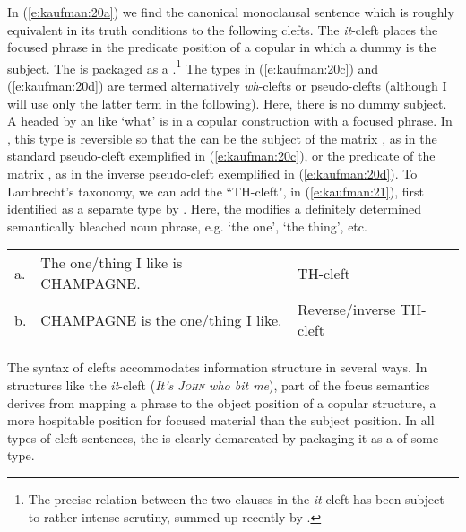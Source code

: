 \documentclass[output=paper]{langsci/langscibook}
\begin{document}
\noindent
In (\ref{e:kaufman:20a}) we find the canonical monoclausal sentence which is roughly equivalent in its truth conditions to the following clefts. The \textit{it}-cleft places the focused phrase in the predicate position of a copular  in which a dummy  is the subject. The  is packaged as a .\footnote{The precise relation between the two clauses in the  \textit{it}-cleft has been subject to rather intense scrutiny, summed up recently by \citet{Reeve:2010}.} The types in (\ref{e:kaufman:20c}) and (\ref{e:kaufman:20d}) are termed alternatively \textit{wh}-clefts or pseudo-clefts (although I will use only the latter term in the following). Here, there is no dummy subject. A  headed by an   like `what' is in a copular construction with a focused phrase. In , this type is reversible so that the  can be the subject of the matrix , as in the standard pseudo-cleft exemplified in (\ref{e:kaufman:20c}), or the predicate of the matrix , as in the inverse pseudo-cleft exemplified in (\ref{e:kaufman:20d}). To Lambrecht's taxonomy, we can add the ``TH-cleft", in (\ref{e:kaufman:21}), first identified as a separate type by \citet{Ball:1977a}. Here, the  modifies a definitely determined semantically bleached noun phrase, e.g. `the one', `the thing', etc. 

\begin{exe}
	\ex\label{e:kaufman:21}
\begin{tabular}[t]{lll}
	a. & The one/thing I like is CHAMPAGNE.& TH-cleft\\
	b. & CHAMPAGNE is the one/thing I like.& Reverse/inverse TH-cleft
\end{tabular}
\end{exe}

\noindent
The syntax of clefts accommodates information structure in several ways. In structures like the  \textit{it}-cleft (\textit{It's \textsc{John} who bit me}), part of the focus semantics derives from mapping a phrase to the object position of a copular structure, a more hospitable position for focused material than the subject position. In all types of cleft sentences, the  is clearly demarcated by packaging it as a  of some type. 
\end{document}

